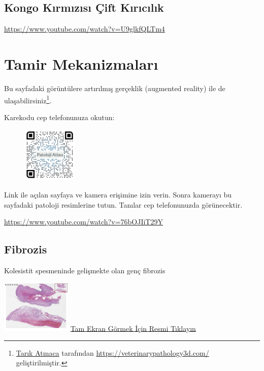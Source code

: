 \documentclass[
  letterpaper,
  DIV=11,
  numbers=noendperiod]{scrreprt}
\begin{document}
\hypertarget{sec-amiloidoz-kongo-kirmizisi-cift-kiricilik}{%
\section{Kongo Kırmızısı Çift
Kırıcılık}\label{sec-amiloidoz-kongo-kirmizisi-cift-kiricilik}}

\url{https://www.youtube.com/watch?v=U9glkfQLTm4}

\hypertarget{sec-tamir-mekanizmalari}{%
\chapter{Tamir Mekanizmaları}\label{sec-tamir-mekanizmalari}}

Bu sayfadaki görüntülere artırılmış gerçeklik (augmented reality) ile de
ulaşabilirsiniz\footnote{\href{https://github.com/veterinarypathology3d}{Tarık
  Atmaca} tarafından \url{https://veterinarypathology3d.com/}
  geliştirilmiştir.}.

Karekodu cep telefonunuza okutun:

\begin{figure}

\includegraphics[width=1.04167in,height=\textheight]{images/AR-tamir.jpeg} \hfill{}

\end{figure}

Link ile açılan sayfaya ve kamera erişimine izin verin. Sonra kamerayı
bu sayfadaki patoloji resimlerine tutun. Tanılar cep telefonunuzda
görünecektir.

\url{https://www.youtube.com/watch?v=76bOJIiT29Y}

\hypertarget{sec-fibrozis}{%
\section{Fibrozis}\label{sec-fibrozis}}

Kolesistit spesmeninde gelişmekte olan genç fibrozis

\href{https://images.patolojiatlasi.com/fibrosis/HE.html}{\includegraphics[width=0.25\textwidth,height=\textheight]{./screenshots/fibrosis_screenshot.png}}
\href{https://images.patolojiatlasi.com/fibrosis/HE.html}{Tam Ekran
Görmek İçin Resmi Tıklayın}
\end{document}
